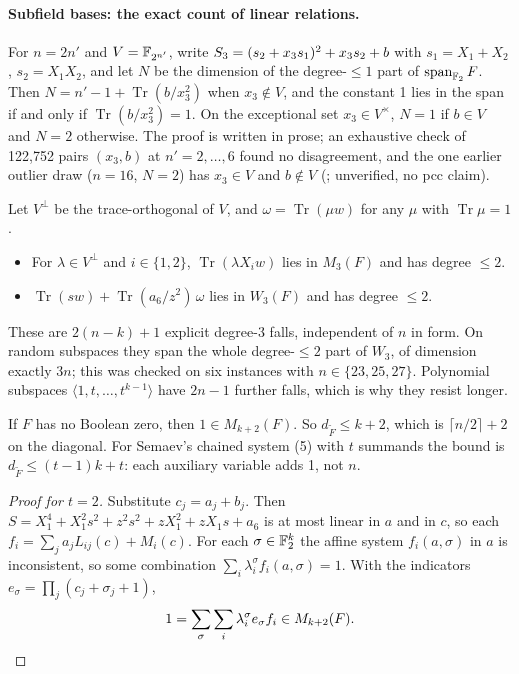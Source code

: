 \paragraph{Subfield bases: the exact count of linear relations.} For
$n=2n'$ and $V=\mathbb{F}_{2^{n'}}$, write $S_{3}=(s_2+x_3s_1)^2+x_3s_2+b$ with
$s_1=X_1+X_2$, $s_2=X_1X_2$, and let $N$ be the dimension of the degree-$\le1$
part of $\operatorname{span}_{\mathbb{F}_2}F$. Then $N=n'-1+\operatorname{Tr}(b/x_3^2)$
when $x_3\notin V$, and the constant 1 lies in the span if and only if
$\operatorname{Tr}(b/x_3^2)=1$. On the exceptional set $x_3\in V^\times$,
$N=1$ if $b\in V$ and $N=2$ otherwise. The proof is written in prose; an
exhaustive check of 122{,}752 pairs $(x_3,b)$ at $n'=2,\ldots,6$ found no
disagreement, and the one earlier outlier draw ($n=16$, $N=2$) has
$x_3\in V$ and $b\notin V$
(;
unverified, no pcc claim).

\begin{lemma}\label{lem:deg3}
Let $V^\perp$ be the trace-orthogonal of $V$, and
$\omega=\operatorname{Tr}(\mu w)$ for any $\mu$ with $\operatorname{Tr}\mu=1$.
\begin{itemize}
\item For $\lambda\in V^\perp$ and $i\in\{1,2\}$, $\operatorname{Tr}(\lambda X_iw)$
  lies in $M_3(F)$ and has degree $\le2$.
\item $\operatorname{Tr}(sw)+\operatorname{Tr}(a_6/z^2)\,\omega$ lies in
  $W_3(F)$ and has degree $\le2$.
\end{itemize}
These are $2(n-k)+1$ explicit degree-3 falls, independent of $n$ in form.
On random subspaces they span the whole degree-$\le2$ part of $W_3$, of
dimension exactly $3n$; this was checked on six instances with
$n\in\{23,25,27\}$. Polynomial subspaces $\langle1,t,\ldots,t^{k-1}\rangle$
have $2n-1$ further falls, which is why they resist longer.
\end{lemma}

\begin{theorem}\label{thm:upper}
If $F$ has no Boolean zero, then $1\in M_{k+2}(F)$. So $d_{\tilde F}\le k+2$,
which is $\lceil n/2\rceil+2$ on the diagonal. For Semaev's chained system
(5) with $t$ summands the bound is $d_{\tilde F}\le(t-1)k+t$: each
auxiliary variable adds 1, not $n$.
\end{theorem}

\begin{proof}[Proof for $t=2$]
Substitute $c_j=a_j+b_j$. Then
$S=X_1^4+X_1^2s^2+z^2s^2+zX_1^2+zX_1s+a_6$ is at most linear in $a$ and in
$c$, so each $f_i=\sum_ja_jL_{ij}(c)+M_i(c)$. For each
$\sigma\in\mathbb{F}_2^k$ the affine system $f_i(a,\sigma)$ in $a$ is
inconsistent, so some combination $\sum_i\lambda_i^\sigma f_i(a,\sigma)=1$.
With the indicators $e_\sigma=\prod_j(c_j+\sigma_j+1)$,
\[
  1=\sum_\sigma\sum_i\lambda_i^\sigma e_\sigma f_i\in M_{k+2}(F). \qedhere
\]
\end{proof}

